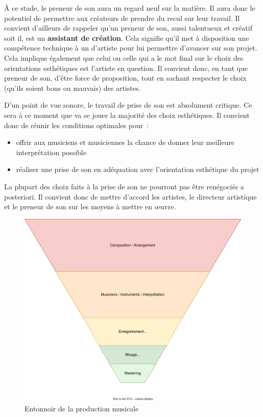 \documentclass[
]{book}
\providecommand{\tightlist}{%
  \setlength{\itemsep}{0pt}\setlength{\parskip}{0pt}}
\begin{document}
À ce stade, le preneur de son aura un regard neuf sur la matière. Il aura donc le potentiel de permettre aux créateurs de prendre du recul sur leur travail. Il convient d'ailleurs de rappeler qu'un preneur de son, aussi talentueux et créatif soit il, est un \textbf{assistant de création}. Cela signifie qu'il met à disposition une compétence technique à un d'artiste pour lui permettre d'avancer sur son projet. Cela implique également que celui ou celle qui a le mot final sur le choix des orientations esthétiques est l'artiste en question. Il convient donc, en tant que preneur de son, d'être force de proposition, tout en sachant respecter le choix (qu'ils soient bons ou mauvais) des artistes.

D'un point de vue sonore, le travail de prise de son est absolument critique. Ce sera à ce moment que va se jouer la majorité des choix esthétiques. Il convient donc de réunir les conditions optimales pour~:

\begin{itemize}
\tightlist
\item
  offrir aux musiciens et musiciennes la chance de donner leur meilleure interprétation possible
\item
  réaliser une prise de son en adéquation avec l'orientation esthétique du projet
\end{itemize}

La plupart des choix faits à la prise de son ne pourront pas être renégociés a posteriori. Il convient donc de mettre d'accord les artistes, le directeur artistique et le preneur de son sur les moyens à mettre en œuvre.

\begin{figure}

{\centering \includegraphics[width=0.8\linewidth]{_resources/diagrams/productionSonore} 

}

\caption{Entonnoir de la production musicale}\label{fig:unnamed-chunk-19}
\end{figure}
\end{document}
